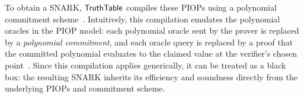 To obtain a SNARK, $\mathsf{TruthTable}$ compiles these PIOPs using a polynomial commitment scheme~\cite{ChiesaHMMVW20,BunzFS20}. Intuitively, this compilation emulates the polynomial oracles in the PIOP model: each polynomial oracle sent by the prover is replaced by a \emph{polynomial commitment}, and each oracle query is replaced by a proof that the committed polynomial evaluates to the claimed value at the verifier’s chosen point~\cite{ChiesaHMMVW20,GabizonWC19}. Since this compilation applies generically, it can be treated as a black box: the resulting SNARK inherits its efficiency and soundness directly from the underlying PIOPs and commitment scheme.